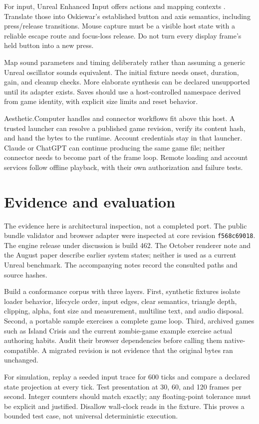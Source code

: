 \documentclass[10pt,letterpaper,twocolumn]{article}
\newcommand{\acdot}{{\color{acpink}.}}
\newcommand{\ac}{Aesthetic{\acdot}Computer}
\newcommand{\code}[1]{\texttt{\nolinkurl{#1}}}
\begin{document}
For input, Unreal Enhanced Input offers actions and mapping contexts \citep{input}. Translate those into Oskiewar's established button and axis semantics, including press/release transitions. Mouse capture must be a visible host state with a reliable escape route and focus-loss release. Do not turn every display frame's held button into a new press.

Map sound parameters and timing deliberately rather than assuming a generic Unreal oscillator sounds equivalent. The initial fixture needs onset, duration, gain, and cleanup checks. More elaborate synthesis can be declared unsupported until its adapter exists. Saves should use a host-controlled namespace derived from game identity, with explicit size limits and reset behavior.

\ac{} handles and connector workflows fit above this host. A trusted launcher can resolve a published game revision, verify its content hash, and hand the bytes to the runtime. Account credentials stay in that launcher. Claude or ChatGPT can continue producing the same game file; neither connector needs to become part of the frame loop. Remote loading and account services follow offline playback, with their own authorization and failure tests.

\section{Evidence and evaluation}\label{sec:evaluation}
The evidence here is architectural inspection, not a completed port. The public bundle validator and browser adapter were inspected at core revision \code{f568c69018}. The engine release under discussion is build 462. The October renderer note and the August paper describe earlier system states; neither is used as a current Unreal benchmark. The accompanying notes record the consulted paths and source hashes.

Build a conformance corpus with three layers. First, synthetic fixtures isolate loader behavior, lifecycle order, input edges, clear semantics, triangle depth, clipping, alpha, font size and measurement, multiline text, and audio disposal. Second, a portable sample exercises a complete game loop. Third, archived games such as Island Crisis and the current zombie-game example exercise actual authoring habits. Audit their browser dependencies before calling them native-compatible. A migrated revision is not evidence that the original bytes ran unchanged.

For simulation, replay a seeded input trace for 600 ticks and compare a declared state projection at every tick. Test presentation at 30, 60, and 120 frames per second. Integer counters should match exactly; any floating-point tolerance must be explicit and justified. Disallow wall-clock reads in the fixture. This proves a bounded test case, not universal deterministic execution.
\end{document}
